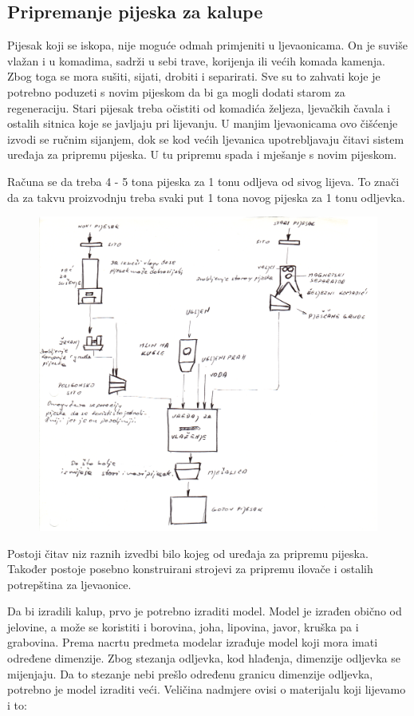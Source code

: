 \documentclass[a4paper,12pt]{article}
\numberwithin{figure}{section}
\begin{document}
\subsection{Pripremanje pijeska za kalupe}
Pijesak koji se iskopa, nije moguće odmah primjeniti u ljevaonicama. On je suviše vlažan i u komadima, sadrži u sebi trave, korijenja ili većih komada kamenja. Zbog toga se mora sušiti, sijati, drobiti i separirati. Sve su to zahvati koje je potrebno poduzeti s novim pijeskom da bi ga mogli dodati starom za regeneraciju. Stari pijesak treba očistiti od komadića željeza, ljevačkih čavala i ostalih sitnica koje se javljaju pri lijevanju. U manjim ljevaonicama ovo čišćenje izvodi se ručnim sijanjem, dok se kod većih ljevanica upotrebljavaju čitavi sistem uređaja za pripremu pijeska. U tu pripremu spada i mješanje s novim pijeskom.\par
Računa se da treba 4 - 5 tona pijeska za 1 tonu odljeva od sivog lijeva. To znači da za takvu proizvodnju treba svaki put 1 tona novog pijeska za 1 tonu odljevka.
\begin{figure}[!h]
\centering
\includegraphics[scale=0.17]{image_58.png}
\end{figure}
\FloatBarrier
Postoji čitav niz raznih izvedbi bilo kojeg od uređaja za pripremu pijeska. Također postoje posebno konstruirani strojevi za pripremu ilovače i ostalih potrepština za ljevaonice. \par
Da bi izradili kalup, prvo je potrebno izraditi model. Model je izrađen obično od jelovine, a može se koristiti i borovina, joha, lipovina, javor, kruška pa i grabovina. Prema nacrtu predmeta modelar izrađuje model koji mora imati određene dimenzije. Zbog stezanja odljevka, kod hlađenja, dimenzije odljevka se mijenjaju. Da to stezanje nebi prešlo određenu granicu dimenzije odljevka, potrebno je model izraditi veći. Veličina nadmjere ovisi o materijalu koji lijevamo i to: 
\end{document}
